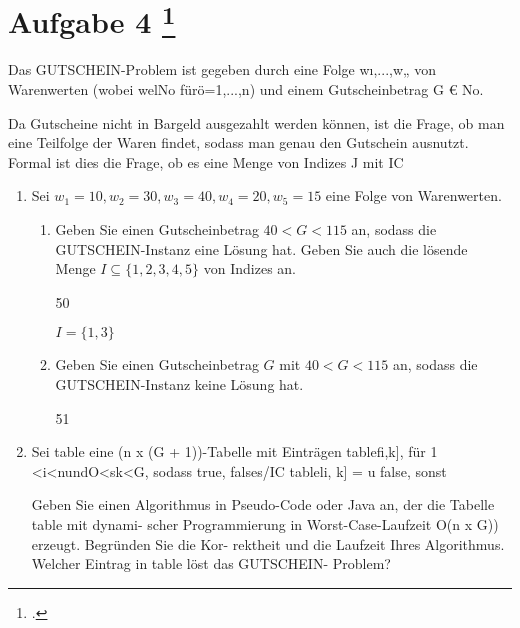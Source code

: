 \documentclass{lehramt-informatik-aufgabe}
\begin{document}
\liAufgabenTitel{}
\section{Aufgabe 4
\footcite{66115:2020:09}}

Das GUTSCHEIN-Problem ist gegeben durch eine Folge wı,...,w„ von
Warenwerten (wobei welNo fürö=1,...,n) und einem Gutscheinbetrag G € No.

Da Gutscheine nicht in Bargeld ausgezahlt werden können, ist die Frage,
ob man eine Teilfolge der Waren findet, sodass man genau den Gutschein
ausnutzt. Formal ist dies die Frage, ob es eine Menge von Indizes J mit
IC
\begin{enumerate}


\item Sei $w_1 = 10, w_2 = 30, w_3 = 40, w_4 = 20, w_5 = 15$ eine Folge
von Warenwerten.

\begin{enumerate}


\item Geben Sie einen Gutscheinbetrag $40 < G < 115$ an, sodass die
GUTSCHEIN-Instanz eine Lösung hat. Geben Sie auch die lösende Menge $I
\subseteq \{ 1, 2, 3, 4, 5 \}$ von Indizes an.

\begin{liAntwort}
50

$I = \{ 1, 3 \}$
\end{liAntwort}


\item Geben Sie einen Gutscheinbetrag $G$ mit $40 < G < 115$ an, sodass die
GUTSCHEIN-Instanz keine Lösung hat.

\begin{liAntwort}
51
\end{liAntwort}

\end{enumerate}


\item Sei table eine (n x (G + 1))-Tabelle mit Einträgen tablefi,k], für 1 <i<nundO<sk<G,
sodass
true, falses/IC
tableli, k] = u
false, sonst

Geben Sie einen Algorithmus in Pseudo-Code oder Java an, der die Tabelle
table mit dynami- scher Programmierung in Worst-Case-Laufzeit O(n x G))
erzeugt. Begründen Sie die Kor- rektheit und die Laufzeit Ihres
Algorithmus. Welcher Eintrag in table löst das GUTSCHEIN- Problem?

\end{enumerate}
\end{document}
